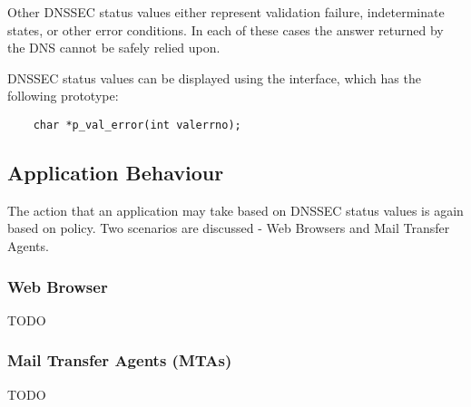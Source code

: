 Other DNSSEC status values either represent validation failure,
indeterminate states, or other error conditions. In each of these cases
the answer returned by the DNS cannot be safely relied upon.
                                                                                                                             
DNSSEC status values can be displayed using the  interface,
which has the following prototype:

\begin{verbatim}
    char *p_val_error(int valerrno);
\end{verbatim}

                                                                                                                             
\subsection{Application Behaviour}
\label{behaviour}
                                                                                                                             
The action that an application may take based on DNSSEC status values is
again based on policy. Two scenarios are discussed - Web Browsers and 
Mail Transfer Agents.
                                                                                                                             
\subsubsection{Web Browser}
\label{browser}
                                                                                                                             
TODO
                                                                                                                             
\subsubsection{Mail Transfer Agents (MTAs)}
\label{mta}
                                                                                                                             
TODO

